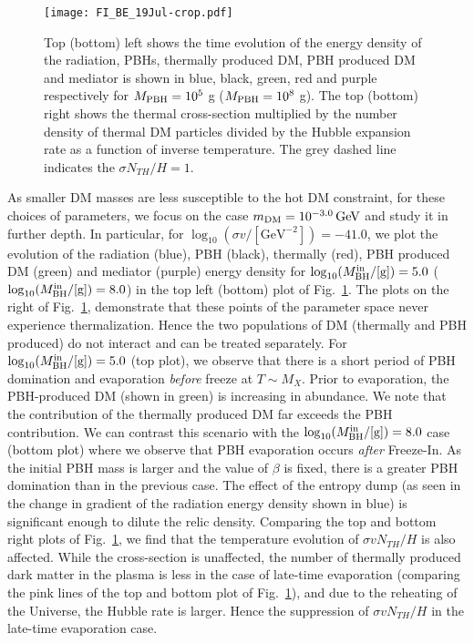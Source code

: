 \documentclass[aps,prd,reprint,twocolumn,preprintnumbers,floatfix,nofootinbib]{revtex4-1}
\newcommand{\mDM}{m_{\rm DM}}
\newcommand{\MBH}{M_{\rm BH}}
\newcommand{\figref}[1]{Fig.~\ref{#1}}
\begin{document}
\begin{figure}[t!]
\centering
 \texttt{[image: FI\_BE\_19Jul-crop.pdf]}
 \caption{\label{fig:FI_dilute2} Top (bottom) left shows the time  
 evolution of the energy density of the radiation, PBHs, thermally produced DM, PBH produced DM and mediator is shown in blue, black, green, red and purple respectively for $M_{\rm{PBH}}=10^{5}$ g ($M_{\rm{PBH}}=10^{8}$ g). The top (bottom) right shows the thermal cross-section multiplied by the number density of thermal DM particles  divided by the Hubble expansion rate as a function of inverse temperature. The grey dashed line indicates the $\sigma N_{TH}/H =1 $.}
\end{figure}


As smaller DM masses are less susceptible to the hot DM constraint, for these choices of parameters,  we focus on the case $\mDM = 10^{-3.0}\, \rm{GeV}$
and study it in further depth.  In particular, for $\log_{10}(\sigma v/[\text{GeV}^{-2}]) =-41.0$, we plot the evolution of the radiation (blue), PBH (black), thermally (red), PBH produced DM (green) and mediator (purple)
energy density for $\log_{10}(\MBH^{\rm in}/[\rm{g}]) = 5.0$ ($\log_{10}(\MBH^{\rm in}/[\rm{g}]) = 8.0$) in the top left (bottom) plot of \figref{fig:FI_dilute2}.
 The plots on the right of \figref{fig:FI_dilute2}, demonstrate that these points of the parameter space never experience thermalization. Hence the two populations of DM (thermally and PBH produced) do not interact and can be treated separately.
For $\log_{10}(\MBH^{\rm in}/[\rm{g}]) = 5.0$ (top plot), we observe that there is a short period of PBH domination and  evaporation  \emph{before} freeze at $T \sim M_X$. Prior to evaporation, the PBH-produced DM (shown in green) is increasing in abundance.
 We note that the contribution of the thermally produced DM far exceeds the PBH contribution. 
We can contrast this scenario with the $\log_{10}(\MBH^{\rm in}/[\rm{g}]) = 8.0$ case (bottom plot) where we observe that 
PBH evaporation occurs \emph{after} Freeze-In. As the initial PBH mass is larger and the value of $\beta$ is fixed, there is a greater 
PBH domination than in the previous case. The effect of the entropy dump
(as seen in the change in gradient of the radiation energy density shown in blue) is significant enough to dilute the relic density. Comparing the top and bottom right plots of \figref{fig:FI_dilute2}, we find that the temperature evolution of $\sigma v N_{TH}/H$
is also affected. While the cross-section is unaffected, the number of thermally produced dark matter in the plasma is less
in the case of late-time evaporation (comparing the pink lines of the top and bottom plot of \figref{fig:FI_dilute2}), and due to the reheating of the Universe, the Hubble rate is larger. Hence the suppression of $\sigma v N_{TH}/H$ in the late-time evaporation case. 
\end{document}
